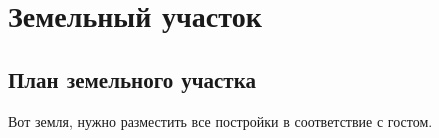 \part{Земельный участок}
\chapter{План земельного участка}
Вот земля, нужно разместить все постройки в соответствие с гостом.	
